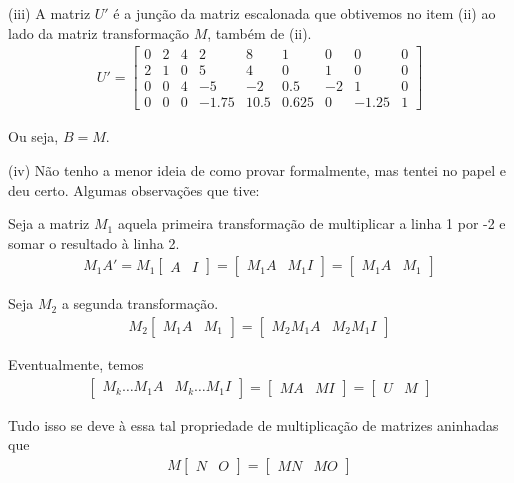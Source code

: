 \documentclass[11pt,reqno,a4paper]{amsart}
\begin{document}
\hrulefill

(iii) A matriz $U'$ é a junção da matriz escalonada que obtivemos no item (ii) ao lado da matriz transformação $M$, também de (ii).
\begin{align*}
	U' = 
	\begin{bmatrix}
		0 & 2 & 4 & 2 & 8 & 1 & 0 & 0 & 0\\
		2 & 1 & 0 & 5 & 4 & 0 & 1 & 0 & 0\\
		0 & 0 & 4 & -5 & -2 & 0.5 & -2 & 1 & 0\\
		0 & 0 & 0 & -1.75 & 10.5 & 0.625 & 0 & -1.25 & 1
	\end{bmatrix}
\end{align*}

Ou seja, $B = M$.

\hrulefill

(iv) Não tenho a menor ideia de como provar formalmente, mas tentei no papel e deu certo.
Algumas observações que tive:

\medskip

Seja a matriz $M_1$ aquela primeira transformação de multiplicar a linha 1 por -2 e somar o resultado à linha 2. 
\begin{align*}
	M_1 A' = M_1 \begin{bmatrix}A & I\end{bmatrix} = \begin{bmatrix}M_1 A & M_1 I\end{bmatrix} = \begin{bmatrix}M_1 A & M_1\end{bmatrix}
\end{align*}

Seja $M_2$ a segunda transformação.
\begin{align*}
	M_2 \begin{bmatrix}M_1 A & M_1\end{bmatrix} = \begin{bmatrix}M_2 M_1 A & M_2 M_1 I\end{bmatrix}
\end{align*}

Eventualmente, temos
\begin{align*}
	\begin{bmatrix}M_k \ldots M_1 A & M_k \ldots M_1 I\end{bmatrix} = \begin{bmatrix}M A & M I\end{bmatrix} = \begin{bmatrix}U & M\end{bmatrix}
\end{align*}

Tudo isso se deve à essa tal propriedade de multiplicação de matrizes aninhadas que
\begin{align*}
	M \begin{bmatrix}N & O\end{bmatrix} = \begin{bmatrix}M N & M O\end{bmatrix}
\end{align*}


\endgroup
\end{document}
